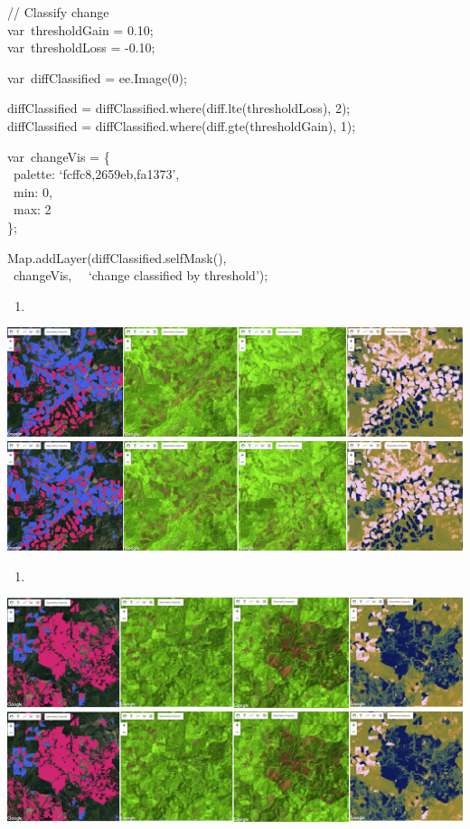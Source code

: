 \documentclass[
  letterpaper,
  DIV=11,
  numbers=noendperiod]{scrreprt}
\providecommand{\tightlist}{%
  \setlength{\itemsep}{0pt}\setlength{\parskip}{0pt}}\usepackage{longtable,booktabs,array}
\begin{document}
// Classify change\\
var~thresholdGain = 0.10;\\
var~thresholdLoss = -0.10;

var~diffClassified = ee.Image(0);

diffClassified = diffClassified.where(diff.lte(thresholdLoss), 2);\\
diffClassified = diffClassified.where(diff.gte(thresholdGain), 1);

var~changeVis = \{\\
\hspace*{0.333em} ~palette: `fcffc8,2659eb,fa1373',\\
\hspace*{0.333em} ~min: 0,\\
\hspace*{0.333em} ~max: 2\\
\};

Map.addLayer(diffClassified.selfMask(),\\
\hspace*{0.333em} ~changeVis,~ ~`change classified by threshold');

\begin{enumerate}
\def\labelenumi{\alph{enumi})}
\tightlist
\item
\end{enumerate}

\includegraphics{./F4/image77.png}\includegraphics{./F4/image77.png}

\begin{enumerate}
\def\labelenumi{\alph{enumi})}
\setcounter{enumi}{1}
\tightlist
\item
\end{enumerate}

\includegraphics{./F4/image17.png}\includegraphics{./F4/image17.png}
\end{document}
